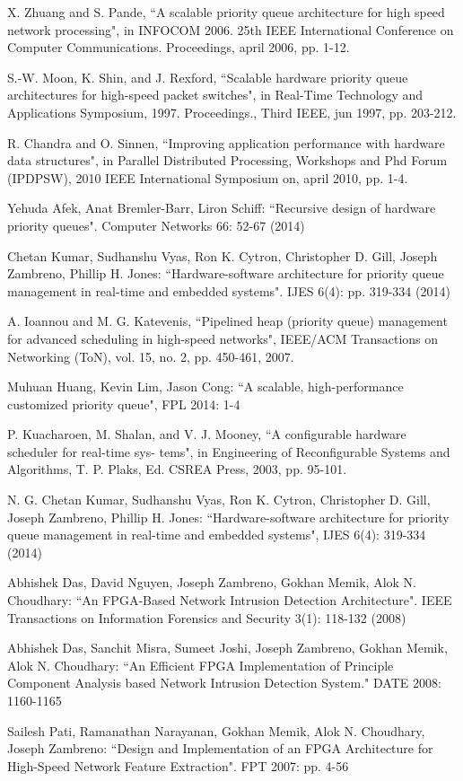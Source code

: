 \documentclass[10pt, conference, compsocconf]{IEEEtran}
\begin{document}
\begin{thebibliography}{1}
 X. Zhuang and S. Pande, ``A scalable priority queue architecture for high speed network processing", in INFOCOM 2006. 25th IEEE International Conference on Computer Communications. Proceedings, april 2006, pp. 1-12.

 S.-W. Moon, K. Shin, and J. Rexford, ``Scalable hardware priority queue architectures for high-speed packet switches", in Real-Time Technology and Applications Symposium, 1997. Proceedings., Third IEEE, jun 1997, pp. 203-212.

 R. Chandra and O. Sinnen, ``Improving application performance with hardware data structures", in Parallel Distributed Processing, Workshops and Phd Forum (IPDPSW), 2010 IEEE International Symposium on, april 2010, pp. 1-4.
	
 Yehuda Afek, Anat Bremler-Barr, Liron Schiff: ``Recursive design of hardware priority queues". Computer Networks 66: 52-67 (2014)

 Chetan Kumar, Sudhanshu Vyas, Ron K. Cytron, Christopher D. Gill, Joseph Zambreno, Phillip H. Jones:
``Hardware-software architecture for priority queue management in real-time and embedded systems". IJES 6(4): pp. 319-334 (2014)

 A. Ioannou and M. G. Katevenis, ``Pipelined heap (priority queue) management for advanced scheduling in high-speed networks", IEEE/ACM Transactions on Networking (ToN), vol. 15, no. 2, pp. 450-461, 2007.

 Muhuan Huang, Kevin Lim, Jason Cong: ``A scalable, high-performance customized priority queue", FPL 2014: 1-4

 P. Kuacharoen, M. Shalan, and V. J. Mooney, ``A configurable hardware scheduler for real-time sys-
tems", in Engineering of Reconfigurable Systems and Algorithms, T. P. Plaks, Ed. CSREA Press, 2003,
pp. 95-101.

 N. G. Chetan Kumar, Sudhanshu Vyas, Ron K. Cytron, Christopher D. Gill, Joseph Zambreno, Phillip H. Jones:
    ``Hardware-software architecture for priority queue management in real-time and embedded systems", IJES 6(4): 319-334 (2014)


 Abhishek Das, David Nguyen, Joseph Zambreno, Gokhan Memik, Alok N. Choudhary:
``An FPGA-Based Network Intrusion Detection Architecture". IEEE Transactions on Information Forensics and Security 3(1): 118-132 (2008)

 Abhishek Das, Sanchit Misra, Sumeet Joshi, Joseph Zambreno, Gokhan Memik, Alok N. Choudhary:
``An Efficient FPGA Implementation of Principle Component Analysis based Network Intrusion Detection System." DATE 2008: 1160-1165

 Sailesh Pati, Ramanathan Narayanan, Gokhan Memik, Alok N. Choudhary, Joseph Zambreno:
``Design and Implementation of an FPGA Architecture for High-Speed Network Feature Extraction". FPT 2007: pp. 4-56



\end{thebibliography}




\end{document}
